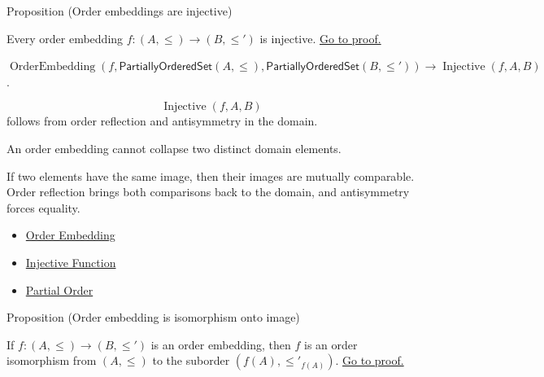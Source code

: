 \begin{propositionbox}{Proposition (Order embeddings are injective)}
\begin{proposition}\label{prop:embedding-injective}
Every order embedding $f : (A, \leq) \to (B, \leq')$ is injective.
\hyperref[prf:embedding-injective]{Go to proof.}
\end{proposition}
\end{propositionbox}

\begin{remark*}
$\operatorname{OrderEmbedding}(f,\mathsf{PartiallyOrderedSet}(A,\leq),
\mathsf{PartiallyOrderedSet}(B,\leq'))\to \operatorname{Injective}(f,A,B)$.
\end{remark*}

\begin{remark*}
\[
  \operatorname{Injective}(f,A,B)
\] follows from order reflection and
antisymmetry in the domain.
\end{remark*}

\begin{remark*}[Interpretation]
An order embedding cannot collapse two distinct domain elements.
\end{remark*}

\begin{remark*}[Exposition]
If two elements have the same image, then their images are mutually comparable.
Order reflection brings both comparisons back to the domain, and antisymmetry
forces equality.
\end{remark*}

\begin{dependencies}
\begin{itemize}
  \item \hyperref[def:order-embedding]{Order Embedding}
  \item \hyperref[def:injective]{Injective Function}
  \item \hyperref[def:partial-order]{Partial Order}
\end{itemize}
\end{dependencies}

\begin{propositionbox}{Proposition (Order embedding is isomorphism onto image)}
\begin{proposition}\label{prop:embedding-iso}
If $f : (A, \leq) \to (B, \leq')$ is an order embedding, then $f$ is an
order isomorphism from $(A, \leq)$ to the suborder $(f(A), \leq'_{f(A)})$.
\hyperref[prf:embedding-iso]{Go to proof.}
\end{proposition}
\end{propositionbox}

